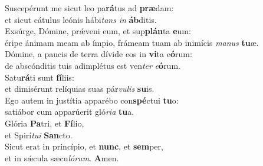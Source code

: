 \oddverse Suscepérunt me sicut leo pa\textbf{rá}tus ad \textbf{præ}dam:~\*\\
\oddverse et sicut cátulus leónis hábi\textit{tans} \textit{in} \textbf{áb}ditis.\\
\evenverse Exsúrge, Dómine, prǽveni eum, et sup\textbf{plán}ta \textbf{e}um:~\*\\
\evenverse éripe ánimam meam ab ímpio, frámeam tuam ab inimícis \textit{ma}\textit{nus} \textbf{tu}æ.\\
\oddverse Dómine, a paucis de terra dívide eos in \textbf{vi}ta e\textbf{ó}rum:~\*\\
\oddverse de abscónditis tuis adimplétus est ven\textit{ter} \textit{e}\textbf{ó}rum.\\
\evenverse Satu\textbf{rá}ti sunt \textbf{fí}liis:~\*\\
\evenverse et dimisérunt relíquias suas pár\textit{vu}\textit{lis} \textbf{su}is.\\
\oddverse Ego autem in justítia apparébo con\textbf{spé}ctui \textbf{tu}o:~\*\\
\oddverse satiábor cum apparúerit gló\textit{ri}\textit{a} \textbf{tu}a.\\
\evenverse Glória \textbf{Pa}tri, et \textbf{Fí}lio,~\*\\
\evenverse et Spirí\textit{tu}\textit{i} \textbf{San}cto.\\
\oddverse Sicut erat in princípio, et \textbf{nunc}, et \textbf{sem}per,~\*\\
\oddverse et in sǽcula sæcu\textit{ló}\textit{rum}. \textbf{A}men.\\
